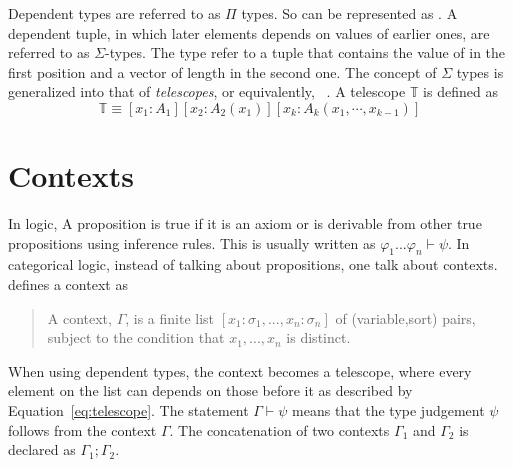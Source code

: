 Dependent types are referred to as $\Pi$ types. So  can be represented as . A dependent tuple, in which later elements depends on values of earlier ones, are referred to as $\Sigma$-types. The type  refer to a tuple that contains the value of  in the first position and a vector of length  in the second one. 
The concept of $\Sigma$ types is generalized into that of \emph{telescopes}, or equivalently,  ~\cite{pollack2002dependently}. A telescope $\mathbb{T}$ is defined as 
\begin{equation}
\mathbb{T} \equiv [x_1 : A_1][x_2 : A_2(x_1)][x_k : A_k(x_1,\cdots,x_{k-1})]
\label{eq:telescope}
\end{equation} 


\section{Contexts}
\label{sec:background:context}
In logic, A proposition is true if it is an axiom or is derivable from other true propositions using inference rules. This is usually written as $\varphi_1 ... \varphi_n \vdash \psi$.  In categorical logic, instead of talking about propositions, one talk about contexts. \cite{handbook1993CategoricalLogic} defines a context as 
\begin{quote}
A context, $\Gamma$, is a finite list $[x_1 : \sigma_1, ... , x_n : \sigma_n]$ of (variable,sort) pairs, subject to the condition that $x_1, ... , x_n$ is distinct.  
\end{quote}
When using dependent types, the context becomes a telescope, where every element on the list can depends on those before it as described by Equation~\ref{eq:telescope}. The statement $\Gamma \vdash \psi$ means that the type judgement $\psi$ follows from the context $\Gamma$. The concatenation of two contexts $\Gamma_1$ and $\Gamma_2$ is declared as $\Gamma_1 ; \Gamma_2$.  

